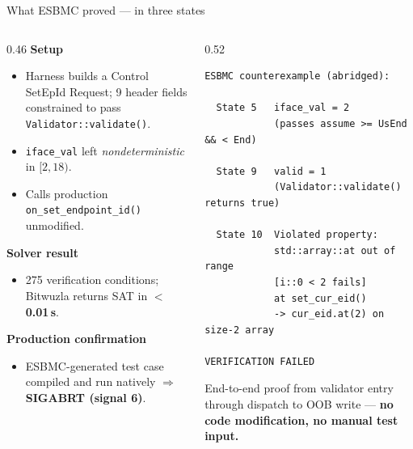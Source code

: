 \documentclass[aspectratio=169,11pt]{beamer}
\newcommand{\hil}[1]{\textbf{\textcolor{nvgreendark}{#1}}}
\begin{document}
\begin{frame}[fragile]{What ESBMC proved --- in three states}
  \begin{columns}[T,onlytextwidth]
    \begin{column}{0.46\textwidth}
      \footnotesize
      \textbf{Setup}
      \begin{itemize}\setlength\itemsep{0.1em}
        \scriptsize
        \item Harness builds a Control SetEpId Request; 9 header
              fields constrained to pass \texttt{Validator::validate()}.
        \item \texttt{iface\_val} left \emph{nondeterministic} in $[2, 18)$.
        \item Calls production \texttt{on\_set\_endpoint\_id()} unmodified.
      \end{itemize}

      \vspace{0.4em}
      \textbf{Solver result}
      \begin{itemize}\setlength\itemsep{0.1em}
        \scriptsize
        \item 275 verification conditions; Bitwuzla returns SAT in
              \hil{$<$ 0.01\,s}.
      \end{itemize}

      \vspace{0.4em}
      \textbf{Production confirmation}
      \begin{itemize}\setlength\itemsep{0.1em}
        \scriptsize
        \item ESBMC-generated test case compiled and run natively
              $\Rightarrow$ \hil{SIGABRT (signal 6)}.
      \end{itemize}
    \end{column}

    \begin{column}{0.52\textwidth}
\begin{lstlisting}[basicstyle=\ttfamily\tiny,language={}]
ESBMC counterexample (abridged):

  State 5   iface_val = 2
            (passes assume >= UsEnd && < End)

  State 9   valid = 1
            (Validator::validate() returns true)

  State 10  Violated property:
            std::array::at out of range
            [i::0 < 2 fails]
            at set_cur_eid()
            -> cur_eid.at(2) on size-2 array

VERIFICATION FAILED
\end{lstlisting}

      \vspace{0.2em}
      {\scriptsize End-to-end proof from validator entry through
      dispatch to OOB write --- \hil{no code modification, no manual
      test input.}}
    \end{column}
  \end{columns}
\end{frame}
\end{document}
